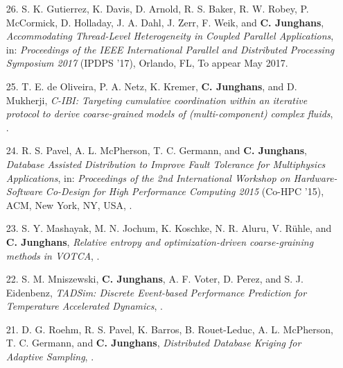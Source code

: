\documentclass{article}
\begin{document}
\begin{enumerate}
\item[26.] S. K. Gutierrez, K. Davis, D. Arnold, R. S. Baker, R. W. Robey, P. McCormick, D. Holladay, J. A. Dahl, J. Zerr, F. Weik, and \textbf{C. Junghans},
  \textit{Accommodating Thread-Level Heterogeneity in Coupled Parallel Applications},
  in: \textit{Proceedings of the IEEE International Parallel and Distributed Processing Symposium 2017} (IPDPS '17),
  Orlando, FL, To appear May 2017.

\item[25.] T. E. de Oliveira, P. A. Netz, K. Kremer, \textbf{C. Junghans}, and D. Mukherji,
  \textit{C-IBI: Targeting cumulative coordination within an iterative protocol to derive coarse-grained models of (multi-component) complex fluids},
  .

\item[24.] R. S. Pavel, A. L. McPherson, T. C. Germann, and \textbf{C. Junghans},
  \textit{Database Assisted Distribution to Improve Fault Tolerance for Multiphysics Applications},
  in: \textit{Proceedings of the 2nd International Workshop on Hardware-Software Co-Design for High Performance Computing 2015} (Co-HPC '15),
  ACM, New York, NY, USA, .

\item[23.] S. Y. Mashayak, M. N. Jochum, K. Koschke, N. R. Aluru, V. R{\"u}hle, and \textbf{C. Junghans},
  \textit{Relative entropy and optimization-driven coarse-graining methods in VOTCA},
  .

\item[22.] S. M. Mniszewski, \textbf{C. Junghans}, A. F. Voter, D. Perez, and S. J. Eidenbenz,
  \textit{TADSim: Discrete Event-based Performance Prediction for Temperature Accelerated Dynamics},
  .

\item[21.] D. G. Roehm, R. S. Pavel, K. Barros, B. Rouet-Leduc, A. L. McPherson, T. C. Germann, and \textbf{C. Junghans},
  \textit{Distributed Database Kriging for Adaptive Sampling},
  .


\end{enumerate}
\end{document}
